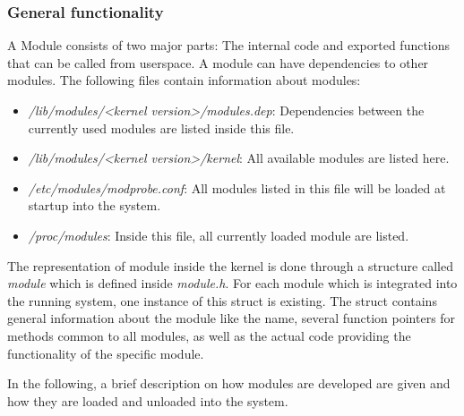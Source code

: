 \documentclass{sig-alternate-05-2015}
\begin{document}
\subsubsection{General functionality}
A Module consists of two major parts: The internal code and exported functions that can be called from userspace. A module can have dependencies to other modules. 
The following files contain information about modules:
\begin{itemize}
\item \emph{/lib/modules/<kernel version>/modules.dep}: Dependencies  between the currently used modules are listed inside this file.
\item \emph{/lib/modules/<kernel version>/kernel}: All available modules are listed here.
\item \emph{/etc/modules/modprobe.conf}: All modules listed in this file will be loaded at startup into the system.
\item \emph{/proc/modules}: Inside this file, all currently loaded module are listed.
\end{itemize}

The representation of module inside the kernel is done through a structure called \emph{module} which is defined inside \emph{module.h}. For each module which is integrated into the running system, one instance of this struct is existing. The struct contains general information about the module like the name, several function pointers for methods common to all modules, as well as the actual code providing the functionality of the specific module.

In the following, a brief description on how modules are developed are given and how they are loaded and unloaded into the system.
\end{document}
